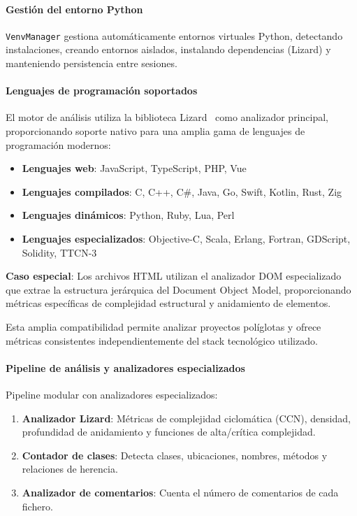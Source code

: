 \documentclass[a4paper, 12pt]{book}
\begin{document}

\paragraph{Gestión del entorno Python}
\texttt{VenvManager} gestiona automáticamente entornos virtuales Python, detectando instalaciones, creando entornos aislados, instalando dependencias (Lizard) y manteniendo persistencia entre sesiones.

\paragraph{Lenguajes de programación soportados}
El motor de análisis utiliza la biblioteca Lizard~\cite{lizard} como analizador principal, proporcionando soporte nativo para una amplia gama de lenguajes de programación modernos:

\begin{itemize}
  \item \textbf{Lenguajes web}: JavaScript, TypeScript, PHP, Vue
  \item \textbf{Lenguajes compilados}: C, C++, C\#, Java, Go, Swift, Kotlin, Rust, Zig
  \item \textbf{Lenguajes dinámicos}: Python, Ruby, Lua, Perl
  \item \textbf{Lenguajes especializados}: Objective-C, Scala, Erlang, Fortran, GDScript, Solidity, TTCN-3
\end{itemize}

\textbf{Caso especial}: Los archivos HTML utilizan el analizador DOM especializado que extrae la estructura jerárquica del Document Object Model, proporcionando métricas específicas de complejidad estructural y anidamiento de elementos.

Esta amplia compatibilidad permite analizar proyectos políglotas y ofrece métricas consistentes independientemente del stack tecnológico utilizado.

\paragraph{Pipeline de análisis y analizadores especializados}
Pipeline modular con analizadores especializados:

\begin{enumerate}
  \item \textbf{Analizador Lizard}: Métricas de complejidad ciclomática (CCN), densidad, profundidad de anidamiento y funciones de alta/crítica complejidad.
  \item \textbf{Contador de clases}: Detecta clases, ubicaciones, nombres, métodos y relaciones de herencia.
  \item \textbf{Analizador de comentarios}: Cuenta el número de comentarios de cada fichero.
\end{enumerate}
\end{document}
